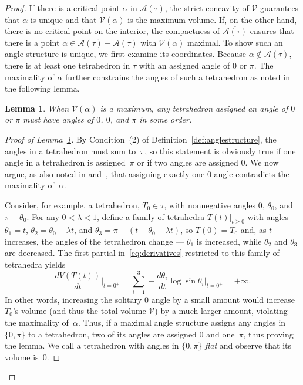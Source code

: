 \documentclass[reqno]{amsart}
\theoremstyle{plain}
\newtheorem{lem}[thm]{Lemma}
\theoremstyle{definition}
\begin{document}
\begin{proof}
If there is a critical point $\alpha$ in $\mathcal A(\tau)$, the strict concavity of $\mathcal{V}$ guarantees that $\alpha$ is unique and that $\mathcal{V}(\alpha)$ is the maximum volume.  If, on the other hand, there is no critical point on the interior, the compactness of $\overline{\mathcal A(\tau)}$ ensures that there is a point $\alpha\in\overline{\mathcal A(\tau)}-\mathcal A(\tau)$ with $\mathcal{V}(\alpha)$ maximal.  To show such an angle structure is unique, we first examine its coordinates.  Because $\alpha\notin\mathcal A(\tau)$, there is at least one tetrahedron in $\tau$ with an assigned angle of $0$ or $\pi$.  The maximality of $\alpha$ further constrains the angles of such a tetrahedron as noted in the following lemma.

\begin{lem}\label{lem:00pi}
When $\mathcal{V}(\alpha)$ is a maximum, any tetrahedron assigned an angle of $0$ or $\pi$ must have angles of $0$, $0$, and $\pi$ in some order. 
\end{lem}

\begin{proof}[Proof of Lemma~\ref{lem:00pi}]
By Condition~(2) of Definition~\ref{def:anglestructure}, the angles in a tetrahedron must sum to~$\pi$, so this statement is obviously true if one angle in a tetrahedron is assigned~$\pi$ or if two angles are assigned $0$. We now argue, as also noted in \cite[Proposition~7.1]{GwithF2Bridge} and~\cite[Proposition~7]{DehnFillings}, that  assigning exactly one $0$ angle contradicts the maximality of~$\alpha$. 

Consider, for example, a tetrahedron, $T_0\in\tau$, with nonnegative angles $0$, $\theta_0$, and $\pi-\theta_0$. For any $0<\lambda<1$, define a family of tetrahedra $T(t)|_{t\ge0}$ with angles $\theta_1=t$, $\theta_2=\theta_0-\lambda t$, and $\theta_3=\pi-(t+\theta_0-\lambda t)$, so $T(0)=T_0$ and, as $t$ increases, the angles of the tetrahedron change --- $\theta_1$ is increased, while $\theta_2$ and $\theta_3$ are decreased.  The first partial in~\eqref{eq:derivatives} restricted to this family of tetrahedra yields
$$
\frac{dV(T(t))}{dt}\Big|_{t=0^+}=\displaystyle{\sum_{i=1}^{3} -\frac{d\theta_i}{dt} \log \sin \theta_i}\Big|_{t=0^+}=+\infty.
$$
In other words, increasing the solitary $0$ angle by a small amount would increase $T_0$'s volume (and thus the total volume $\mathcal{V}$) by a much larger amount, violating the maximality of~$\alpha$.  Thus, if a maximal angle structure assigns any angles in $\{0,\pi\}$ to a tetrahedron, two of its angles are assigned $0$ and one~$\pi$, thus proving the lemma.  We call a tetrahedron with angles in $\{0,\pi\}$ \emph{flat} and observe that its volume is~$0$.
\end{proof}


\end{proof}
\end{document}
